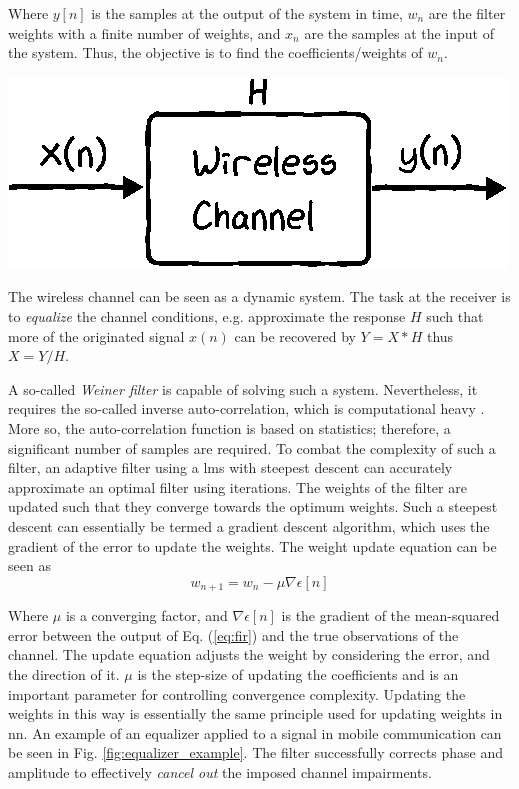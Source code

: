 Where $y[n]$ is the samples at the output of the system in time, $w_n$ are the filter weights with a finite number of weights, and $x_n$ are the samples at the input of the system. Thus, the objective is to find the coefficients/weights of $w_n$. 

\begin{marginfigure}
\includegraphics[]{chapters/part_pathloss/figures/adaptive_filter.eps}
\caption{The wireless channel can be seen as a dynamic system. The task at the receiver is to \emph{equalize} the channel conditions, e.g. approximate the response $H$ such that more of the originated signal $x(n)$ can be recovered by $Y = X*H$ thus $X = Y/H$.}\label{fig:adaptive_filter_system}
\end{marginfigure}

A so-called \emph{Weiner filter} is capable of solving such a system. Nevertheless, it requires the so-called inverse auto-correlation, which is computational heavy \cite{Tan2013DigitalProcessing}. More so, the auto-correlation function is based on statistics; therefore, a significant number of samples are required. To combat the complexity of such a filter, an adaptive filter using a \gls{lms} with steepest descent can accurately approximate an optimal filter using iterations. The weights of the filter are updated such that they converge towards the optimum weights. Such a steepest descent can essentially be termed a gradient descent algorithm, which uses the gradient of the error to update the weights. The weight update equation can be seen as
\begin{equation}
    w_{n+1} = w_n - \mu \nabla  \epsilon [n]
\end{equation}

Where $\mu$ is a converging factor, and $\nabla  \epsilon [n]$ is the gradient of the mean-squared error between the output of Eq. (\ref{eq:fir}) and the true observations of the channel. The update equation adjusts the weight by considering the error, and the direction of it. $\mu$ is the step-size of updating the coefficients and is an important parameter for controlling convergence complexity. Updating the weights in this way is essentially the same principle used for updating weights in \gls{nn}. An example of an equalizer applied to a signal in mobile communication can be seen in Fig. \ref{fig:equalizer_example}. The filter successfully corrects phase and amplitude to effectively \emph{cancel out} the imposed channel impairments.


